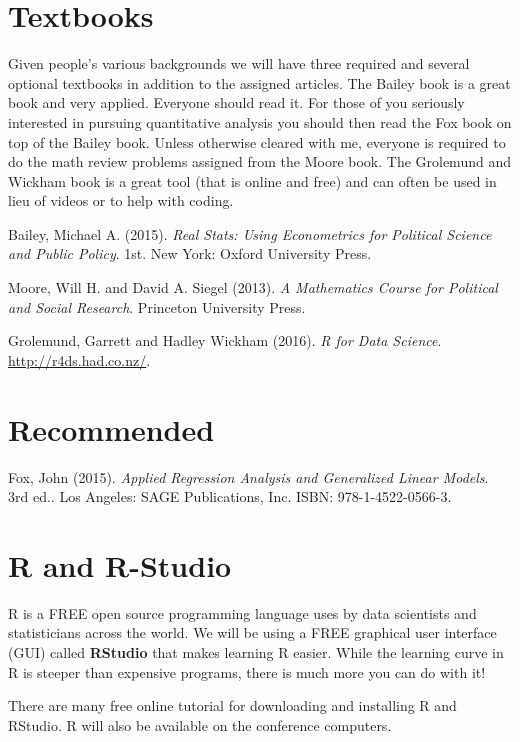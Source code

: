 \documentclass[11pt,]{article}
\begin{document}
\section{Textbooks}\label{textbooks}

Given people's various backgrounds we will have three required and
several optional textbooks in addition to the assigned articles. The
Bailey book is a great book and very applied. Everyone should read it.
For those of you seriously interested in pursuing quantitative analysis
you should then read the Fox book on top of the Bailey book. Unless
otherwise cleared with me, everyone is required to do the math review
problems assigned from the Moore book. The Grolemund and Wickham book is
a great tool (that is online and free) and can often be used in lieu of
videos or to help with coding.

 Bailey, Michael A. (2015).
\emph{Real Stats: Using Econometrics for Political
Science and Public Policy}. 1st. New York: Oxford University Press.

 Moore, Will H. and David A. Siegel (2013).
\emph{A Mathematics Course for Political and Social Research}. Princeton
University Press.

 Grolemund, Garrett and Hadley Wickham (2016).
\emph{R for Data Science}. \url{http://r4ds.had.co.nz/}.

\section{Recommended}\label{recommended}

 Fox, John (2015).
\emph{Applied Regression Analysis and Generalized
Linear Models}. 3rd ed.. Los Angeles: SAGE Publications, Inc. ISBN:
978-1-4522-0566-3.

\section{R and R-Studio}\label{r-and-r-studio}

R is a FREE open source programming language uses by data scientists and
statisticians across the world. We will be using a FREE graphical user
interface (GUI) called \textbf{RStudio} that makes learning R easier.
While the learning curve in R is steeper than expensive programs, there
is much more you can do with it!

There are many free online tutorial for downloading and installing R and
RStudio. R will also be available on the conference computers.
\end{document}
